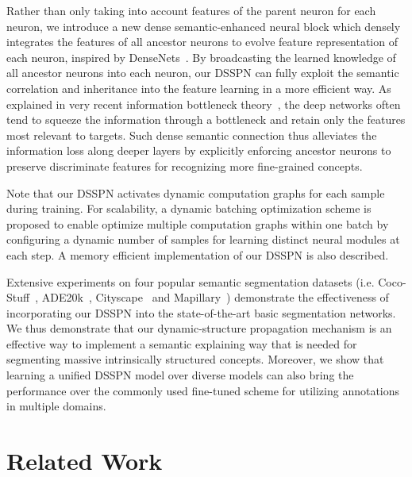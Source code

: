 \documentclass[10pt,twocolumn,letterpaper]{article}
\begin{document}
 Rather than only taking into account features of the parent neuron for each neuron, we introduce a new dense semantic-enhanced neural block which densely integrates the features of all ancestor neurons to evolve feature representation of each neuron, inspired by DenseNets~\cite{huang2016densely}. By broadcasting the learned knowledge of all ancestor neurons into each neuron, our DSSPN can fully exploit the semantic correlation and inheritance into the feature learning in a more efficient way. As explained in very recent information bottleneck theory~\cite{tishby2015deep}, the deep networks often tend to squeeze the information through a bottleneck and retain only the features most relevant to targets. Such dense semantic connection thus alleviates the information loss along deeper layers by explicitly enforcing ancestor neurons to preserve discriminate features for recognizing more fine-grained concepts. 
 
 Note that our DSSPN activates dynamic computation graphs for each sample during training. For scalability, a dynamic batching optimization scheme is proposed to enable optimize multiple computation graphs within one batch by configuring a dynamic number of samples for learning distinct neural modules at each step. A memory efficient implementation of our DSSPN is also described.
 
 Extensive experiments on four popular semantic segmentation datasets (i.e. Coco-Stuff~\cite{caesar2016coco}, ADE20k~\cite{zhou2016semantic}, Cityscape~\cite{cordts2015cityscapes} and Mapillary~\cite{neuhold2017mapillary}) demonstrate the effectiveness of incorporating our DSSPN into the state-of-the-art basic segmentation networks. We thus demonstrate that our dynamic-structure propagation mechanism is an effective way to implement a semantic explaining way that is needed for segmenting massive intrinsically structured concepts. Moreover, we show that learning a unified DSSPN model over diverse models can also bring the performance over the commonly used fine-tuned scheme for utilizing annotations in multiple domains.
 


	
\section{Related Work}
\end{document}
